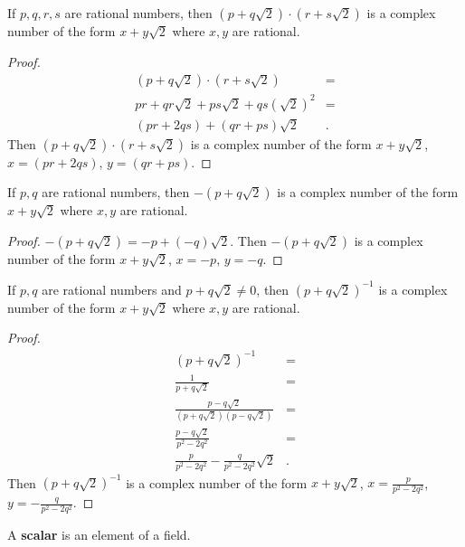 \documentclass[12pt]{article}
\begin{document}
\begin{lemma}
  If $p,q,r,s$ are rational numbers, then $(p + q\sqrt{2})
  \cdot (r + s\sqrt{2})$ is a complex number of the form $x +
  y\sqrt{2}$ where $x, y$ are rational.
  \begin{proof}
    \begin{align*}
      (p + q\sqrt{2}) \cdot (r + s\sqrt{2}) &=\\
      pr + qr\sqrt{2} + ps\sqrt{2} + qs(\sqrt{2})^{2} &=\\
      (pr + 2qs) + (qr + ps)\sqrt{2}&.
    \end{align*}
    Then $(p + q\sqrt{2}) \cdot (r + s\sqrt{2})$ is a complex
    number of the form $x + y\sqrt{2}$, $x = (pr + 2qs)$, $y =
    (qr + ps)$.
  \end{proof}
\end{lemma}

\begin{lemma}
  If $p,q$ are rational numbers, then $-(p + q\sqrt{2})$ is a
  complex number of the form $x + y\sqrt{2}$ where $x, y$ are
  rational.
  \begin{proof}
    $-(p + q\sqrt{2}) = -p + (-q)\sqrt{2}$. Then $-(p +
    q\sqrt{2})$ is a complex number of the form $x + y\sqrt{2}$,
    $x = -p$, $y = -q$.
  \end{proof}
\end{lemma}

\begin{lemma}
  If $p,q$ are rational numbers and $p + q\sqrt{2} \neq 0$, then
  $(p + q\sqrt{2})^{-1}$ is a complex number of the form $x +
  y\sqrt{2}$ where $x, y$ are rational.
  \begin{proof}
    \begin{align*}
      (p + q\sqrt{2})^{-1} &=\\
      \frac{1}{p + q\sqrt{2}} &=\\
      \frac{p - q\sqrt{2}}{(p + q\sqrt{2})(p - q\sqrt{2})} &=\\
      \frac{p - q\sqrt{2}}{p^{2} - 2q^{2}} &=\\
      \frac{p}{p^{2} - 2q^{2}} - \frac{q}{p^{2} - 2q^{2}}\sqrt{2}&.
    \end{align*}
    Then $(p + q\sqrt{2})^{-1}$ is a complex number of the form
    $x + y\sqrt{2}$, $x = \frac{p}{p^{2} - 2q^{2}}$, $y =
    -\frac{q}{p^{2} - 2q^{2}}$.
  \end{proof}
\end{lemma}

\begin{defn}
  A \textbf{scalar} is an element of a field.
\end{defn}
\end{document}

